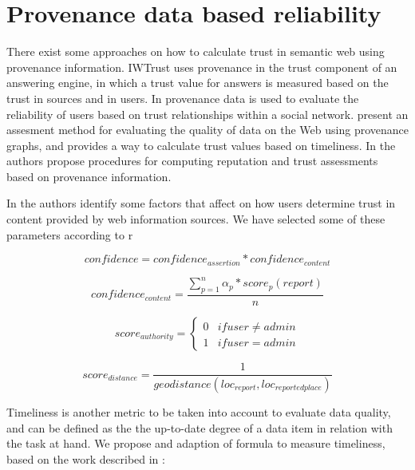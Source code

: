 \section{Provenance data based reliability}
\label{sec:provenance}

There exist some approaches on how to calculate trust in semantic web using provenance information. IWTrust \cite{trento} uses provenance in the trust component of an answering engine, in which a trust value for answers is measured based on the trust in sources and in users. In \cite{golbeck} provenance data is used to evaluate the reliability of users based on trust relationships within a social network. \cite{hartig} present an assesment method for evaluating the quality of data on the Web using provenance graphs, and provides a way to calculate trust values based on timeliness. In \cite{ceolin} the authors propose procedures for computing reputation and trust assessments based on provenance information.

In \cite{} the authors identify some factors that affect on how users determine trust in content provided by web information sources. We have selected some of these parameters according to r


\begin{equation}
confidence = confidence_{assertion} * confidence_{content}
\end{equation}

\begin{equation}
confidence_{content} = \frac{\sum_{p=1}^{n} \alpha_p * score_p(report)}{n}
\end{equation}

\begin{equation}
score_{authority} = \left\{\begin{matrix}
0 & if user \neq admin \\
1 & if user = admin
\end{matrix}\right.
\end{equation}

\begin{equation}
score_{distance} = \frac{1}{geodistance(loc_{report}, loc_{reportedplace})}
\end{equation}


Timeliness is another metric to be taken into account to evaluate data quality, and can be defined as the the up-to-date degree of a data item in relation with the task at hand. We propose and adaption of \cite{Hartig09usingweb} formula to measure timeliness, based on the work described in \cite{Ballou:1998:MIM:291329.291335}:

